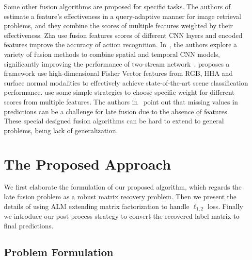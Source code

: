 \documentclass[10pt,twocolumn,letterpaper]{article}
\begin{document}
Some other fusion algorithms are proposed for specific tasks.
The authors of \cite{zheng2015query} estimate a feature’s effectiveness in a query-adaptive manner for image retrieval problems,
and they combine the scores of multiple features weighted by their effectiveness.
Zha \etal \cite{zha2015exploiting} use fusion features scores of different CNN layers and encoded features improve the accuracy of action recognition.
In~\cite{feichtenhofer2016convolutional}, the authors explore a variety of fusion methods to combine spatial and temporal CNN models, significantly improving the performance of two-stream network~\cite{simonyan2014two}.
\cite{wangmodality} proposes a framework use high-dimensional Fisher Vector features from RGB, HHA and surface normal modalities to effectively achieve state-of-the-art scene classification performance.
\cite{Wang_Transformation,tapaswi2015movieqa,yaohighlight} use some simple strategies to choose specific weight for different scores from multiple features.
The authors in~\cite{vanicassp2014late} point out that missing values in predictions can be a challenge for late fusion due to the absence of features.
These special designed fusion algorithms can be hard to extend to general problems, being lack of generalization.



\section{The Proposed Approach}


We first elaborate the formulation of our proposed algorithm,
which regards the late fusion problem as a robust matrix recovery problem.
Then we present the details of using ALM extending matrix factorization to handle $\ell_{1,2}$ loss.
Finally we introduce our post-process strategy to convert the recovered label matrix to final predictions.

\subsection{Problem Formulation}
\end{document}

